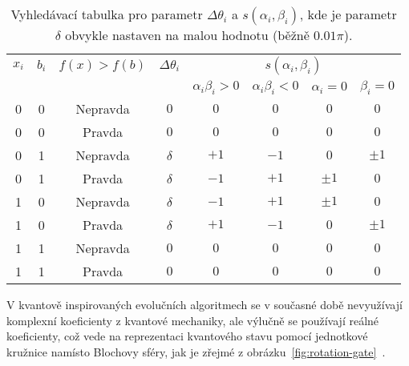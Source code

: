 \begin{enumerate}
        \begin{table}[ht!]
            \centering
            \begin{tabular}{|c|c|c|c|c|c|c|c|}
                \hline
                $x_i$ & $b_i$ & $f\left(x\right) > f\left(b\right)$ & $\Delta \theta_i$ & \multicolumn{4}{c|}{$s\left(\alpha_i, \beta_i\right)$} \\
                \cline{5-8}
                & & & & $\alpha_i \beta_i > 0$& $\alpha_i \beta_i < 0$ & $ \alpha_i = 0$ & $\beta_i = 0$ \\
                \hline
                0 & 0 & Nepravda & $0$      & $0$  & $0$  & $0$     & $0$ \\
                0 & 0 & Pravda   & $0$      & $0$  & $0$  & $0$     & $0$ \\
                0 & 1 & Nepravda & $\delta$ & $+1$ & $-1$ & $0$     & $\pm 1$ \\
                0 & 1 & Pravda   & $\delta$ & $-1$ & $+1$ & $\pm 1$ & $0$ \\
                1 & 0 & Nepravda & $\delta$ & $-1$ & $+1$ & $\pm 1$ & $0$ \\
                1 & 0 & Pravda   & $\delta$ & $+1$ & $-1$ & $0$     & $\pm 1$ \\
                1 & 1 & Nepravda & $0$      & $0$  & $0$  & $0$     & $0$ \\
                1 & 1 & Pravda   & $0$      & $0$  & $0$  & $0$     & $0$ \\
                \hline
            \end{tabular}
            \caption{Vyhledávací tabulka pro parametr $\Delta\theta_i$ a $s\left(\alpha_i, \beta_i\right)$, kde je parametr $\delta$ obvykle nastaven na malou hodnotu (běžně $0.01 \pi$).}
            \label{tab:look-up-table-angle-update}
        \end{table}
\end{enumerate}

V kvantově inspirovaných evolučních algoritmech se v současné době nevyužívají komplexní koeficienty z kvantové mechaniky, ale výlučně se používají reálné koeficienty, což vede na reprezentaci kvantového stavu pomocí jednotkové kružnice namísto Blochovy sféry, jak je zřejmé z obrázku~\ref{fig:rotation-gate}~\cite{NaturalComputing}.

